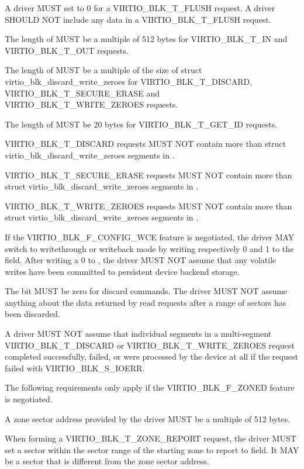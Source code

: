A driver MUST set  to 0 for a VIRTIO_BLK_T_FLUSH request.
A driver SHOULD NOT include any data in a VIRTIO_BLK_T_FLUSH request.

The length of  MUST be a multiple of 512 bytes for VIRTIO_BLK_T_IN
and VIRTIO_BLK_T_OUT requests.

The length of  MUST be a multiple of the size of struct
virtio_blk_discard_write_zeroes for VIRTIO_BLK_T_DISCARD,
VIRTIO_BLK_T_SECURE_ERASE and VIRTIO_BLK_T_WRITE_ZEROES requests.

The length of  MUST be 20 bytes for VIRTIO_BLK_T_GET_ID requests.

VIRTIO_BLK_T_DISCARD requests MUST NOT contain more than
 struct virtio_blk_discard_write_zeroes segments in
.

VIRTIO_BLK_T_SECURE_ERASE requests MUST NOT contain more than
 struct virtio_blk_discard_write_zeroes segments in
.

VIRTIO_BLK_T_WRITE_ZEROES requests MUST NOT contain more than
 struct virtio_blk_discard_write_zeroes segments in
.

If the VIRTIO_BLK_F_CONFIG_WCE feature is negotiated, the driver MAY
switch to writethrough or writeback mode by writing respectively 0 and
1 to the  field.  After writing a 0 to ,
the driver MUST NOT assume that any volatile writes have been committed
to persistent device backend storage.

The  bit MUST be zero for discard commands.  The driver
MUST NOT assume anything about the data returned by read requests after
a range of sectors has been discarded.

A driver MUST NOT assume that individual segments in a multi-segment
VIRTIO_BLK_T_DISCARD or VIRTIO_BLK_T_WRITE_ZEROES request completed
successfully, failed, or were processed by the device at all if the request
failed with VIRTIO_BLK_S_IOERR.

The following requirements only apply if the VIRTIO_BLK_F_ZONED feature is
negotiated.

A zone sector address provided by the driver MUST be a multiple of 512 bytes.

When forming a VIRTIO_BLK_T_ZONE_REPORT request, the driver MUST set a sector
within the sector range of the starting zone to report to  field.
It MAY be a sector that is different from the zone sector address.


